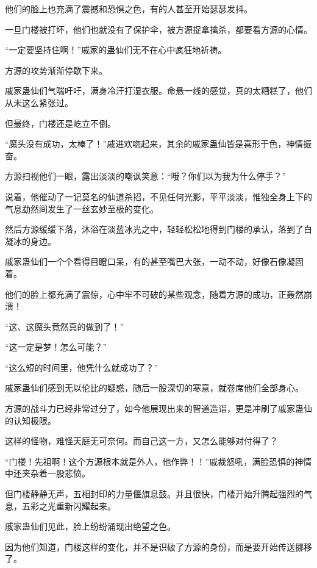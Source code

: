 \begin{this_body}
他们的脸上也充满了震撼和恐惧之色，有的人甚至开始瑟瑟发抖。

一旦门楼被打坏，他们也就没有了保护伞，被方源捉拿擒杀，都要看方源的心情。

“一定要坚持住啊！”戚家的蛊仙们无不在心中疯狂地祈祷。

方源的攻势渐渐停歇下来。

戚家蛊仙们气喘吁吁，满身冷汗打湿衣服。命悬一线的感觉，真的太糟糕了，他们从未这么紧张过。

但最终，门楼还是屹立不倒。

“魔头没有成功，太棒了！”戚进欢唿起来，其余的戚家蛊仙皆是喜形于色，神情振奋。

方源扫视他们一眼，露出淡淡的嘲讽笑意：“哦？你们以为我为什么停手？”

说着，他催动了一记莫名的仙道杀招，不见任何光影，平平淡淡，惟独全身上下的气息勐然间发生了一丝玄妙至极的变化。

然后方源缓缓下落，沐浴在淡蓝冰光之中，轻轻松松地得到门楼的承认，落到了白凝冰的身边。

戚家蛊仙们一个个看得目瞪口呆，有的甚至嘴巴大张，一动不动，好像石像凝固着。

他们的脸上都充满了震惊，心中牢不可破的某些观念，随着方源的成功，正轰然崩溃！

“这、这魔头竟然真的做到了！”

“这一定是梦！怎么可能？”

“这么短的时间里，他凭什么就成功了？”

戚家蛊仙们感到无以伦比的疑惑，随后一股深切的寒意，就卷席他们全部身心。

方源的战斗力已经非常过分了，如今他展现出来的智道造诣，更是冲刷了戚家蛊仙的认知极限。

这样的怪物，难怪天庭无可奈何。而自己这一方，又怎么能够对付得了？

“门楼！先祖啊！这个方源根本就是外人，他作弊！！”戚裁怒吼，满脸恐惧的神情中还夹杂着一股悲愤。

但门楼静静无声，五相封印的力量偃旗息鼓。并且很快，门楼开始升腾起强烈的气息，五彩之光重新闪耀起来。

戚家蛊仙们见此，脸上纷纷涌现出绝望之色。

因为他们知道，门楼这样的变化，并不是识破了方源的身份，而是要开始传送挪移了。

\end{this_body}

